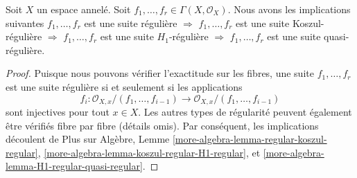 \begin{lemma}
\label{lemma-types-regular-sequences-implications}
Soit  $X$  un espace annelé. Soit  $f_1, \ldots, f_r \in \Gamma(X, \mathcal{O}_X)$. Nous avons les implications
suivantes  $f_1, \ldots, f_r$  est une suite régulière  $\Rightarrow$   $f_1, \ldots, f_r$  est une
suite Koszul-régulière  $\Rightarrow$   $f_1, \ldots, f_r$  est une suite
 $H_1$-régulière  $\Rightarrow$   $f_1, \ldots, f_r$  est une suite quasi-régulière.
\end{lemma}

\begin{proof}
Puisque nous pouvons vérifier l'exactitude sur les fibres, une suite  $f_1, \ldots, f_r$ 
est une suite régulière si et seulement si les applications
$$
f_i :
\mathcal{O}_{X, x}/(f_1, \ldots, f_{i - 1})
\longrightarrow
\mathcal{O}_{X, x}/(f_1, \ldots, f_{i - 1})
$$
sont injectives pour tout  $x \in X$. Les autres types de régularité peuvent
également être vérifiés fibre par fibre (détails omis). Par conséquent, les
implications découlent de Plus sur Algèbre, Lemme  \ref{more-algebra-lemma-regular-koszul-regular},  \ref{more-algebra-lemma-koszul-regular-H1-regular}, et
 \ref{more-algebra-lemma-H1-regular-quasi-regular}.
\end{proof}

